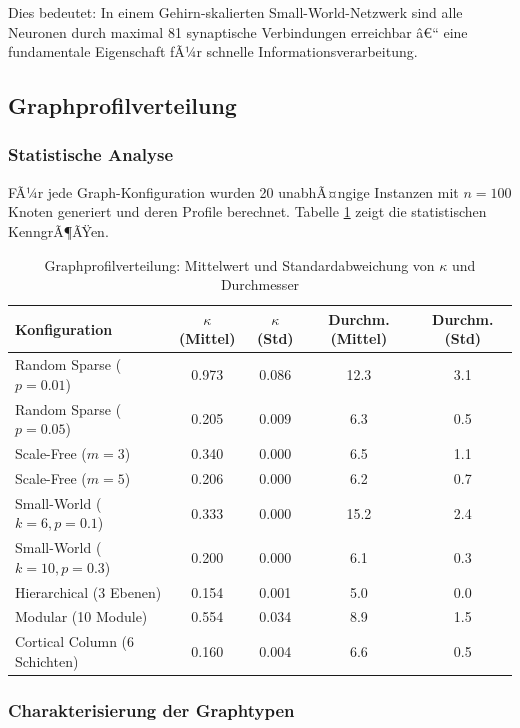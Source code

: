 ﻿\documentclass[a4paper,12pt]{article}
\theoremstyle{definition}
\begin{document}
	Dies bedeutet: In einem Gehirn-skalierten Small-World-Netzwerk sind alle Neuronen durch maximal 81 synaptische Verbindungen erreichbar â€“ eine fundamentale Eigenschaft fÃ¼r schnelle Informationsverarbeitung.
	
	\subsection{Graphprofilverteilung}
	
	\subsubsection{Statistische Analyse}
	
	FÃ¼r jede Graph-Konfiguration wurden 20 unabhÃ¤ngige Instanzen mit $n = 100$ Knoten generiert und deren Profile berechnet. Tabelle \ref{tab:distribution} zeigt die statistischen KenngrÃ¶ÃŸen.
	
	\begin{table}[H]
		\centering
		\caption{Graphprofilverteilung: Mittelwert und Standardabweichung von $\kappa$ und Durchmesser}
		\label{tab:distribution}
		\small
		\begin{tabular}{lcccc}
			\hline
			\textbf{Konfiguration} & $\kappa$ (Mittel) & $\kappa$ (Std) & \textbf{Durchm.} (Mittel) & \textbf{Durchm.} (Std) \\
			\hline
			Random Sparse ($p=0.01$) & 0.973 & 0.086 & 12.3 & 3.1 \\
			Random Sparse ($p=0.05$) & 0.205 & 0.009 & 6.3 & 0.5 \\
			Scale-Free ($m=3$) & 0.340 & 0.000 & 6.5 & 1.1 \\
			Scale-Free ($m=5$) & 0.206 & 0.000 & 6.2 & 0.7 \\
			Small-World ($k=6, p=0.1$) & 0.333 & 0.000 & 15.2 & 2.4 \\
			Small-World ($k=10, p=0.3$) & 0.200 & 0.000 & 6.1 & 0.3 \\
			Hierarchical (3 Ebenen) & 0.154 & 0.001 & 5.0 & 0.0 \\
			Modular (10 Module) & 0.554 & 0.034 & 8.9 & 1.5 \\
			Cortical Column (6 Schichten) & 0.160 & 0.004 & 6.6 & 0.5 \\
			\hline
		\end{tabular}
	\end{table}
	
	\subsubsection{Charakterisierung der Graphtypen}
	
\end{document}
